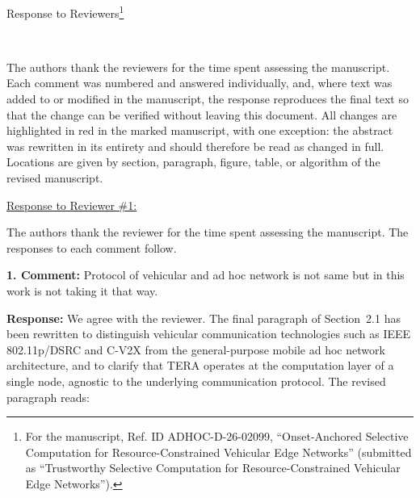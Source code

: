 \documentclass[1p,12pt,authoryear]{elsarticle}
\begin{document}
\newpage

\makeatletter
\def\@xfootnote[#1]{%
  \protected@xdef\@thefnmark{#1}%
  \@footnotemark\@footnotetext}
\makeatother

\begin{center}
\huge Response to Reviewers\footnote[*]{For the manuscript, Ref. ID ADHOC-D-26-02099, ``Onset-Anchored Selective Computation for Resource-Constrained Vehicular Edge Networks'' (submitted as ``Trustworthy Selective Computation for Resource-Constrained Vehicular Edge Networks'').}
\end{center}

~

\noindent The authors thank the reviewers for the time spent assessing the manuscript. Each comment was numbered and answered individually, and, where text was added to or modified in the manuscript, the response reproduces the final text so that the change can be verified without leaving this document. All changes are highlighted in red in the marked manuscript, with one exception: the abstract was rewritten in its entirety and should therefore be read as changed in full. Locations are given by section, paragraph, figure, table, or algorithm of the revised manuscript.

\newpage


\begin{large}
\noindent \underline{Response to Reviewer \#1:}
\end{large}

\vspace{10pt}

\noindent The authors thank the reviewer for the time spent assessing the manuscript. The responses to each comment follow.

\vspace{0.5cm}
\noindent \textbf{1. Comment:} Protocol of vehicular and ad hoc network is not same but in this work is not taking it that way.

\vspace{2mm}
\noindent \textbf{Response:} We agree with the reviewer. The final paragraph of Section~2.1 has been rewritten to distinguish vehicular communication technologies such as IEEE 802.11p/DSRC and C-V2X from the general-purpose mobile ad hoc network architecture, and to clarify that TERA operates at the computation layer of a single node, agnostic to the underlying communication protocol. The revised paragraph reads:
\end{document}
